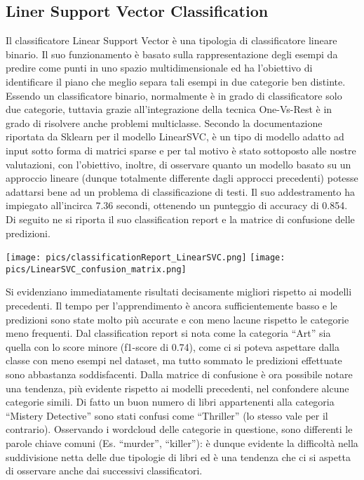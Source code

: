 \documentclass[12pt,oneside]{article}
\begin{document}
    \begin{enumerate}
    \subsection{Liner Support Vector Classification}
    \begin{justify}
        Il classificatore Linear Support Vector è una tipologia di classificatore lineare binario. Il suo funzionamento è basato sulla rappresentazione degli esempi da predire come punti in uno spazio multidimensionale ed ha l’obiettivo di identificare il piano che meglio separa tali esempi in due categorie ben distinte. Essendo un classificatore binario, normalmente è in grado di classificatore solo due categorie, tuttavia grazie all’integrazione della tecnica One-Vs-Rest è in grado di risolvere anche problemi multiclasse. 
        Secondo la documentazione riportata da Sklearn per il modello LinearSVC, è un tipo di modello adatto ad input sotto forma di matrici sparse e per tal motivo è stato sottoposto alle nostre valutazioni, con l’obiettivo, inoltre, di osservare quanto un modello basato su un approccio lineare (dunque totalmente differente dagli approcci precedenti) potesse adattarsi bene ad un problema di classificazione di testi.
        Il suo addestramento ha impiegato all’incirca 7.36 secondi, ottenendo un punteggio di accuracy di 0.854. Di seguito ne si riporta il suo classification report e la matrice di confusione delle predizioni.
        \end{justify}

        \texttt{[image: pics/classificationReport\_LinearSVC.png]}
        \texttt{[image: pics/LinearSVC\_confusion\_matrix.png]}

        
        \begin{justify}
        Si evidenziano immediatamente risultati decisamente migliori rispetto ai modelli precedenti. Il tempo per l’apprendimento è ancora sufficientemente basso e le predizioni sono state molto più accurate e con meno lacune rispetto le categorie meno frequenti. Dal classification report si nota come la categoria “Art” sia quella con lo score minore (f1-score di 0.74), come ci si poteva aspettare dalla classe con meno esempi nel dataset, ma tutto sommato le predizioni effettuate sono abbastanza soddisfacenti. Dalla matrice di confusione è ora possibile notare una tendenza, più evidente rispetto ai modelli precedenti, nel confondere alcune categorie simili. Di fatto un buon numero di libri appartenenti alla categoria “Mistery Detective” sono stati confusi come “Thriller” (lo stesso vale per il contrario). Osservando i wordcloud delle categorie in questione, sono differenti le parole chiave comuni (Es. “murder”, “killer”): è dunque evidente la difficoltà nella suddivisione netta delle due tipologie di libri ed è una tendenza che ci si aspetta di osservare anche dai successivi classificatori.
    \end{justify}
    \end{enumerate}
\end{document}
